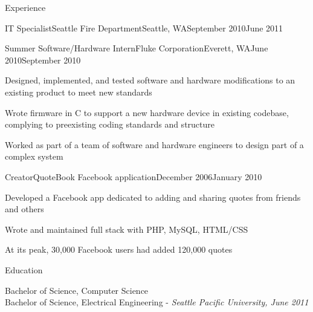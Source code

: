 \documentclass[letterpaper,10pt]{article}
\begin{document}
\begin{res_section}{Experience}
\begin{res_experienceitem}{IT Specialist}{Seattle Fire Department}{Seattle, WA}{September 2010}{June 2011}
\end{res_experienceitem}
\begin{res_experienceitem}{Summer Software/Hardware Intern}{Fluke Corporation}{Everett, WA}{June 2010}{September 2010}
  \item Designed, implemented, and tested software and hardware modifications to an existing product to meet new standards
  \item Wrote firmware in C to support a new hardware device in existing codebase, complying to preexisting coding standards and structure
  \item Worked as part of a team of software and hardware engineers to design part of a complex system
\end{res_experienceitem}
\begin{res_experienceitem}{Creator}{QuoteBook Facebook application}{}{December 2006}{January 2010}
  \item Developed a Facebook app dedicated to adding and sharing quotes from friends and others
  \item Wrote and maintained full stack with PHP, MySQL, HTML/CSS
  \item At its peak, 30,000 Facebook users had added 120,000 quotes
\end{res_experienceitem}
\end{res_section}

\begin{res_section}{Education}
\begin{res_content}{Bachelor of Science, Computer Science\\
Bachelor of Science, Electrical Engineering - \em{Seattle Pacific University, June 2011}
}
\end{res_content}
\end{res_section}
\end{document}
